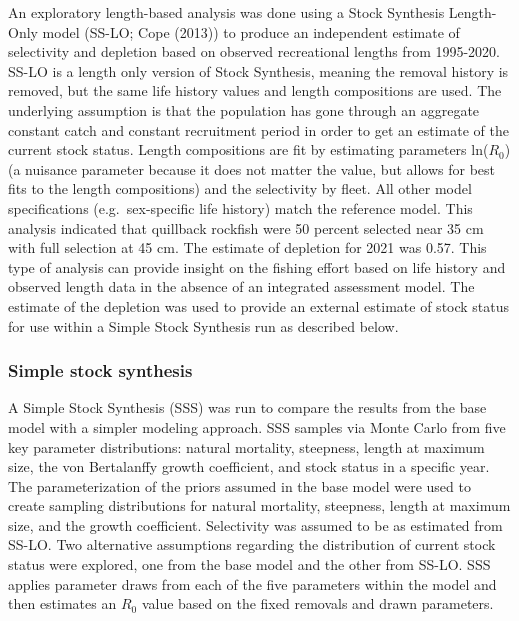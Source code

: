 \documentclass[11pt,
  english,
  letterpaper,
]{article}
\begin{document}
\leavevmode\tagmcend\tagstructend


An exploratory length-based analysis was done using a Stock Synthesis Length-Only model (SS-LO; Cope {(2013)\leavevmode\tagmcend\tagstructend}) to produce an independent estimate of selectivity and depletion based on observed recreational lengths from 1995-2020. SS-LO is a length only version of Stock Synthesis, meaning the removal history is removed, but the same life history values and length compositions are used. The underlying assumption is that the population has gone through an aggregate constant catch and constant recruitment period in order to get an estimate of the current stock status. Length compositions are fit by estimating parameters ln({\(R_0\)\leavevmode\tagmcend\tagstructend}) (a nuisance parameter because it does not matter the value, but allows for best fits to the length compositions) and the selectivity by fleet. All other model specifications (e.g.~sex-specific life history) match the reference model. This analysis indicated that quillback rockfish were 50 percent selected near 35 cm with full selection at 45 cm. The estimate of depletion for 2021 was 0.57. This type of analysis can provide insight on the fishing effort based on life history and observed length data in the absence of an integrated assessment model. The estimate of the depletion was used to provide an external estimate of stock status for use within a Simple Stock Synthesis run as described below.

\leavevmode\tagmcend\tagstructend\par


\hypertarget{simple-stock-synthesis}{%
\subsubsection{Simple stock synthesis}\label{simple-stock-synthesis}}

\leavevmode\tagmcend\tagstructend


A Simple Stock Synthesis (SSS) was run to compare the results from the base model with a simpler modeling approach. SSS samples via Monte Carlo from five key parameter distributions: natural mortality, steepness, length at maximum size, the von Bertalanffy growth coefficient, and stock status in a specific year. The parameterization of the priors assumed in the base model were used to create sampling distributions for natural mortality, steepness, length at maximum size, and the growth coefficient. Selectivity was assumed to be as estimated from SS-LO. Two alternative assumptions regarding the distribution of current stock status were explored, one from the base model and the other from SS-LO. SSS applies parameter draws from each of the five parameters within the model and then estimates an {\(R_0\)\leavevmode\tagmcend\tagstructend} value based on the fixed removals and drawn parameters.
\end{document}
